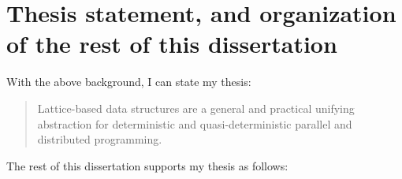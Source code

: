\ifdefined\DISSERTATION
\section{Thesis statement, and organization of the rest of this dissertation}\label{s:intro-thesis}

With the above background, I can state my thesis:
\begin{quote}
  Lattice-based data structures are a general and practical unifying
  abstraction for deterministic and quasi-deterministic parallel and
  distributed programming.
\end{quote}
  The rest of this
dissertation supports my thesis as follows:
